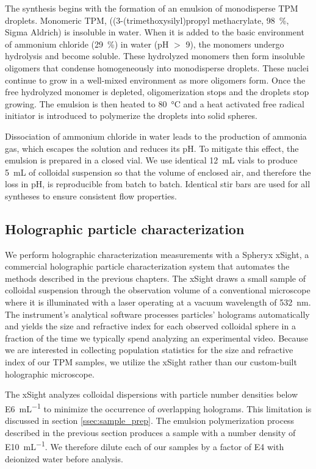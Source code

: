 The synthesis begins with the formation of an emulsion of monodisperse TPM droplets.
Monomeric TPM, ((3-(trimethoxysilyl)propyl methacrylate, \SI{98}{\percent}, Sigma Aldrich)
is insoluble in water. When it is added to the basic environment
of ammonium chloride (\SI{29}{\percent}) in water (pH $>$ \num{9}),
the monomers undergo hydrolysis and become soluble. 
These hydrolyzed monomers then form insoluble 
oligomers that condense homogeneously into monodisperse droplets.
These nuclei continue to grow in a well-mixed environment as more oligomers form.
Once the free hydrolyzed monomer is depleted, oligomerization stops and
the droplets stop growing.
The emulsion is then heated to \SI{80}{\degreeCelsius} and a heat activated free radical 
initiator is introduced to polymerize the droplets into solid spheres.

Dissociation of ammonium chloride in water leads to the production of ammonia
gas, which escapes the solution and reduces its pH.
To mitigate this effect, the emulsion is prepared in a closed vial.
We use identical \SI{12}{\milli\liter} vials to produce \SI{5}{\milli\liter}
of colloidal suspension so that the volume of enclosed air, and therefore
the loss in pH, is reproducible from batch to batch. Identical stir bars are used for all syntheses
to ensure consistent flow properties.

\subsection{Holographic particle characterization}

We perform holographic characterization measurements with a Spheryx xSight,
a commercial holographic particle characterization system
that automates the methods described in the previous chapters.
The xSight draws a small sample of colloidal suspension through the
observation volume of a conventional microscope where it is illuminated
with a laser operating at a vacuum wavelength of \SI{532}{\nm}.
The instrument's analytical software processes particles' holograms automatically
and yields the size and refractive index for each observed colloidal sphere
in a fraction of the time we typically spend analyzing an experimental video.
Because we are interested in collecting population statistics for the size and refractive
index of our TPM samples, we utilize the xSight rather than our custom-built holographic
microscope.

The xSight analyzes colloidal dispersions with particle number densities below 
\SI{E6}{\milli\liter^{-1}} to minimize the occurrence of overlapping holograms.
This limitation is discussed in section \ref{ssec:sample_prep}.
The emulsion polymerization process described in the previous section
produces a sample with a number density of \SI{E10}{\milli\liter^{-1}}.
We therefore dilute each of our samples by a factor of \SI{E4}{} with
deionized water before analysis.

